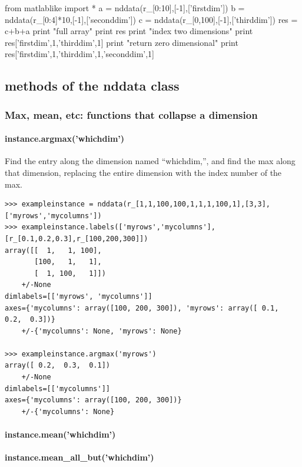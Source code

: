 

\begin{python}
from matlablike import *
a = nddata(r_[0:10],[-1],['firstdim'])
b = nddata(r_[0:4]*10,[-1],['seconddim'])
c = nddata(r_[0,100],[-1],['thirddim'])
res = c+b+a
print "full array"
print res
print "index two dimensions"
print res['firstdim',1,'thirddim',1]
print "return zero dimensional"
print res['firstdim',1,'thirddim',1,'seconddim',1]
\end{python}
\subsection{methods of the nddata class}
\subsubsection{Max, mean, etc: functions that collapse a dimension}
\paragraph{instance.argmax('whichdim')}
Find the entry along the dimension named ``whichdim,'', and find the max along that dimension, replacing the entire dimension with the index number of the max.

\begin{lstlisting}
>>> exampleinstance = nddata(r_[1,1,100,100,1,1,1,100,1],[3,3],['myrows','mycolumns'])
>>> exampleinstance.labels(['myrows','mycolumns'],[r_[0.1,0.2,0.3],r_[100,200,300]])
array([[  1,   1, 100],
       [100,   1,   1],
       [  1, 100,   1]])
    +/-None
dimlabels=[['myrows', 'mycolumns']]
axes={'mycolumns': array([100, 200, 300]), 'myrows': array([ 0.1,  0.2,  0.3])}
    +/-{'mycolumns': None, 'myrows': None}

>>> exampleinstance.argmax('myrows')
array([ 0.2,  0.3,  0.1])
    +/-None
dimlabels=[['mycolumns']]
axes={'mycolumns': array([100, 200, 300])}
    +/-{'mycolumns': None}

\end{lstlisting}
\paragraph{instance.mean('whichdim')}
\paragraph{instance.mean\_all\_but('whichdim')}
